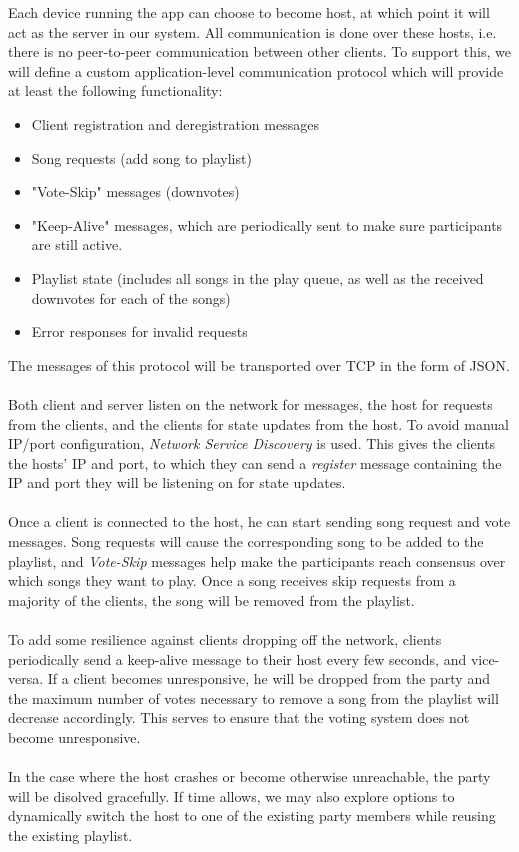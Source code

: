 \documentclass{report}
\begin{document}
Each device running the app can choose to become host, at which point it will
act as the server in our system. All communication is done over these hosts, 
i.e. there is no peer-to-peer communication between other clients.
To support this, we will define a custom application-level communication protocol 
which will provide at least the following functionality:
\begin{itemize}
\item Client registration and deregistration messages
\item Song requests (add song to playlist)
\item "Vote-Skip" messages (downvotes)
\item "Keep-Alive" messages, which are periodically sent to make sure participants are still active.
\item Playlist state (includes all songs in the play queue, as well as the received downvotes for each of the songs)
\item Error responses for invalid requests
\end{itemize}
%
The messages of this protocol will be transported over TCP in the form of JSON.\\\\
%
Both client and server listen on the network for messages,
the host for requests from the clients, and the clients for state updates
from the host. To avoid manual IP/port configuration, \emph{Network Service Discovery}
\cite{nsd} is used. This gives the clients the hosts' IP and port,
to which they can send a \emph{register} message containing the IP and port they
will be listening on for state updates. \\\\
%
Once a client is connected to the host, he can start sending song request and vote messages.
Song requests will cause the corresponding song to be added to the playlist, and \emph{Vote-Skip}
messages help make the participants reach consensus over which songs they want to play. 
Once a song receives skip requests
from a majority of the clients, the song will be removed from the playlist.\\\\ 
%
To add some resilience against clients dropping off the network, clients periodically 
send a keep-alive message to their host every few seconds, and vice-versa.
If a client becomes unresponsive, he will be dropped from the party and the maximum number of votes
necessary to remove a song from the playlist will decrease accordingly. This serves to
ensure that the voting system does not become unresponsive.\\\\
%
In the case where the host crashes or become otherwise unreachable, the party will be 
disolved gracefully. If time allows, we may also explore options to dynamically switch 
the host to one of the existing party members while reusing the existing playlist.
%
\end{document}
